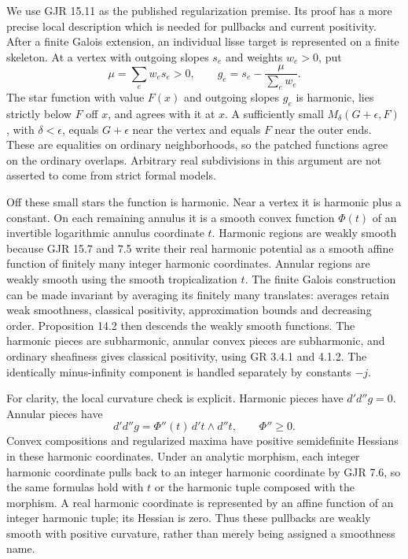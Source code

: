 \documentclass[11pt]{article}
\begin{document}
We use GJR 15.11 as the published regularization premise. Its proof has a more precise local description which is needed for pullbacks and current positivity. After a finite Galois extension, an individual lisse target is represented on a finite skeleton. At a vertex with outgoing slopes \(s_e\) and weights \(w_e>0\), put
\[
\mu=\sum_e w_es_e>0,\qquad
g_e=s_e-\frac{\mu}{\sum_e w_e}.
\]
The star function with value \(F(x)\) and outgoing slopes \(g_e\) is harmonic, lies strictly below \(F\) off \(x\), and agrees with it at \(x\). A sufficiently small \(M_\delta(G+\epsilon,F)\), with \(\delta<\epsilon\), equals \(G+\epsilon\) near the vertex and equals \(F\) near the outer ends. These are equalities on ordinary neighborhoods, so the patched functions agree on the ordinary overlaps. Arbitrary real subdivisions in this argument are not asserted to come from strict formal models.

Off these small stars the function is harmonic. Near a vertex it is harmonic plus a constant. On each remaining annulus it is a smooth convex function \(\Phi(t)\) of an invertible logarithmic annulus coordinate \(t\). Harmonic regions are weakly smooth because GJR 15.7 and 7.5 write their real harmonic potential as a smooth affine function of finitely many integer harmonic coordinates. Annular regions are weakly smooth using the smooth tropicalization \(t\). The finite Galois construction can be made invariant by averaging its finitely many translates: averages retain weak smoothness, classical positivity, approximation bounds and decreasing order. Proposition 14.2 then descends the weakly smooth functions. The harmonic pieces are subharmonic, annular convex pieces are subharmonic, and ordinary sheafiness gives classical positivity, using GR 3.4.1 and 4.1.2. The identically minus-infinity component is handled separately by constants \(-j\).

For clarity, the local curvature check is explicit. Harmonic pieces have \(d'd''g=0\). Annular pieces have
\[
d'd''g=\Phi''(t)\,d't\wedge d''t,\qquad\Phi''\ge0.
\]
Convex compositions and regularized maxima have positive semidefinite Hessians in these harmonic coordinates. Under an analytic morphism, each integer harmonic coordinate pulls back to an integer harmonic coordinate by GJR 7.6, so the same formulas hold with \(t\) or the harmonic tuple composed with the morphism. A real harmonic coordinate is represented by an affine function of an integer harmonic tuple; its Hessian is zero. Thus these pullbacks are weakly smooth with positive curvature, rather than merely being assigned a smoothness name.
\end{document}
